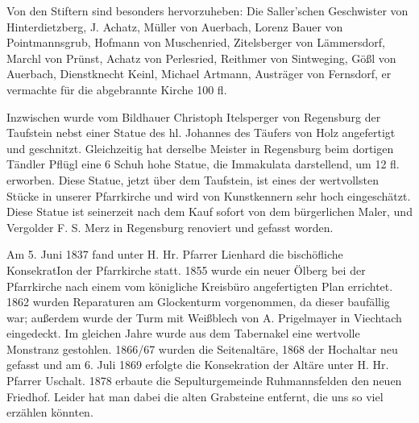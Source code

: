 \documentclass[12pt,a4paper]{book}
\begin{document}
Von den Stiftern sind besonders hervorzuheben: Die Saller'schen Geschwister von
Hinterdietzberg, J. Achatz, Müller von Auerbach, Lorenz Bauer von
Pointmannsgrub, Hofmann von Muschenried, Zitelsberger von Lämmersdorf, Marchl
von Prünst, Achatz von Perlesried, Reithmer von Sintweging, Gößl von Auerbach,
Dienstknecht Keinl, Michael Artmann, Austräger von Fernsdorf, er vermachte für
die abgebrannte Kirche 100 fl.

Inzwischen wurde vom Bildhauer Christoph Itelsperger von Regensburg der
Taufstein nebst einer Statue des hl. Johannes des Täufers von Holz angefertigt
und geschnitzt. Gleichzeitig hat derselbe Meister in Regensburg beim dortigen
Tändler Pflügl eine 6 Schuh hohe Statue, die Immakulata darstellend, um 12 fl.
erworben. Diese Statue, jetzt über dem Taufstein, ist eines der wertvollsten
Stücke in unserer Pfarrkirche und wird von Kunstkennern sehr hoch eingeschätzt.
Diese Statue ist seinerzeit nach dem Kauf sofort von dem bürgerlichen Maler, und
Vergolder F. S. Merz in Regensburg renoviert und gefasst worden.

Am 5. Juni 1837 fand unter H. Hr. Pfarrer Lienhard die bischöfliche KonsekratIon
der Pfarrkirche statt. 1855 wurde ein neuer Ölberg bei der Pfarrkirche nach
einem vom königliche Kreisbüro angefertigten Plan errichtet. 1862 wurden
Reparaturen am Glockenturm vorgenommen, da dieser baufällig war; außerdem wurde
der Turm mit Weißblech von A. Prigelmayer in Viechtach eingedeckt. Im gleichen
Jahre wurde aus dem Tabernakel eine wertvolle Monstranz gestohlen. 1866/67
wurden die Seitenaltäre, 1868 der Hochaltar neu gefasst und am 6. Juli 1869
erfolgte die Konsekration der Altäre unter H. Hr. Pfarrer Uschalt. 1878 erbaute
die Sepulturgemeinde Ruhmannsfelden den neuen Friedhof. Leider hat man dabei die
alten Grabsteine entfernt, die uns so viel erzählen könnten.
\end{document}
